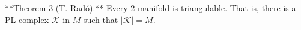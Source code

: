 **Theorem 3 (T. Radó).** Every 2-manifold is triangulable. That is, there is a PL complex $\mathcal{K}$ in $M$ such that $|\mathcal{K}| = M$.
